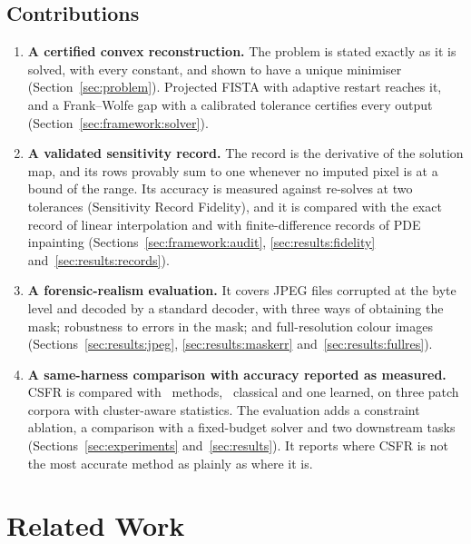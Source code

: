 \documentclass[final,3p]{elsarticle}
\begin{document}
\subsection{Contributions}

\begin{enumerate}
  \item \textbf{A certified convex reconstruction.} The problem is stated exactly as it is solved, with every constant, and shown to have a unique minimiser (Section~\ref{sec:problem}). Projected FISTA with adaptive restart reaches it, and a Frank--Wolfe gap with a calibrated tolerance certifies every output (Section~\ref{sec:framework:solver}).
  \item \textbf{A validated sensitivity record.} The record is the derivative of the solution map, and its rows provably sum to one whenever no imputed pixel is at a bound of the range. Its accuracy is measured against re-solves at two tolerances (Sensitivity Record Fidelity), and it is compared with the exact record of linear interpolation and with finite-difference records of PDE inpainting (Sections~\ref{sec:framework:audit}, \ref{sec:results:fidelity} and~\ref{sec:results:records}).
  \item \textbf{A forensic-realism evaluation.} It covers JPEG files corrupted at the byte level and decoded by a standard decoder, with three ways of obtaining the mask; robustness to errors in the mask; and full-resolution colour images (Sections~\ref{sec:results:jpeg}, \ref{sec:results:maskerr} and~\ref{sec:results:fullres}).
  \item \textbf{A same-harness comparison with accuracy reported as measured.} CSFR is compared with \methodsTotal\ methods, \methodsClassical\ classical and one learned, on three patch corpora with cluster-aware statistics. The evaluation adds a constraint ablation, a comparison with a fixed-budget solver and two downstream tasks (Sections~\ref{sec:experiments} and~\ref{sec:results}). It reports where CSFR is not the most accurate method as plainly as where it is.
\end{enumerate}

\section{Related Work}
\label{sec:related}
\end{document}
